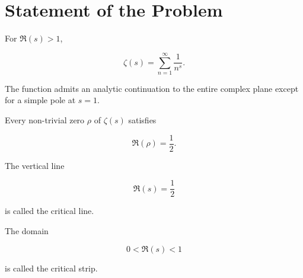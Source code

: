 \section{Statement of the Problem}

\begin{definition}
For $\Re(s)>1$,

\[
\zeta(s)
=
\sum_{n=1}^{\infty}\frac{1}{n^s}.
\]

\end{definition}

The function admits an analytic continuation to the entire complex plane except for a simple pole at $s=1$.

\begin{theorem}
Every non-trivial zero $\rho$ of $\zeta(s)$ satisfies

\[
\Re(\rho)=\frac12.
\]

\end{theorem}

The vertical line

\[
\Re(s)=\frac12
\]

is called the critical line.

The domain

\[
0<\Re(s)<1
\]

is called the critical strip.
